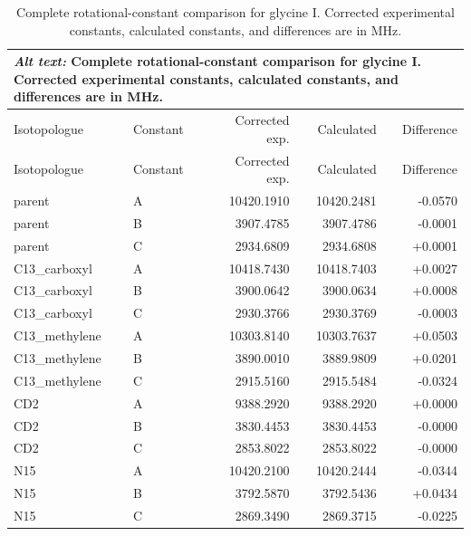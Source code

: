 \documentclass[12pt]{article}
\begin{document}
\begin{longtable}{llrrr}
\caption{Complete rotational-constant comparison for glycine I. Corrected experimental constants, calculated constants, and differences are in MHz.}\label{tab:si-glycine-I-rotconstants}\\
\multicolumn{5}{p{0.98\linewidth}}{\textit{Alt text:} Complete rotational-constant comparison for glycine I. Corrected experimental constants, calculated constants, and differences are in MHz.}\\
\toprule
Isotopologue & Constant & Corrected exp. & Calculated & Difference \\
\midrule
\endfirsthead
\toprule
Isotopologue & Constant & Corrected exp. & Calculated & Difference \\
\midrule
\endhead
parent & A & 10420.1910 & 10420.2481 & -0.0570 \\
parent & B & 3907.4785 & 3907.4786 & -0.0001 \\
parent & C & 2934.6809 & 2934.6808 & +0.0001 \\
C13\_carboxyl & A & 10418.7430 & 10418.7403 & +0.0027 \\
C13\_carboxyl & B & 3900.0642 & 3900.0634 & +0.0008 \\
C13\_carboxyl & C & 2930.3766 & 2930.3769 & -0.0003 \\
C13\_methylene & A & 10303.8140 & 10303.7637 & +0.0503 \\
C13\_methylene & B & 3890.0010 & 3889.9809 & +0.0201 \\
C13\_methylene & C & 2915.5160 & 2915.5484 & -0.0324 \\
CD2 & A & 9388.2920 & 9388.2920 & +0.0000 \\
CD2 & B & 3830.4453 & 3830.4453 & -0.0000 \\
CD2 & C & 2853.8022 & 2853.8022 & -0.0000 \\
N15 & A & 10420.2100 & 10420.2444 & -0.0344 \\
N15 & B & 3792.5870 & 3792.5436 & +0.0434 \\
N15 & C & 2869.3490 & 2869.3715 & -0.0225 \\
\bottomrule
\end{longtable}
\end{document}

